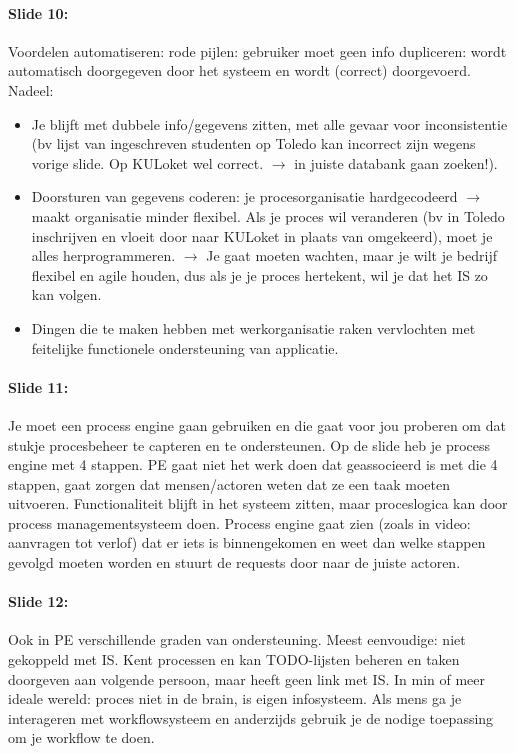 \documentclass[10pt,a4paper]{report}
\begin{document}
\paragraph{Slide 10:}Voordelen automatiseren: rode pijlen: gebruiker moet geen info dupliceren: wordt automatisch doorgegeven door het systeem en wordt (correct) doorgevoerd.\\
Nadeel:
\begin{itemize}
\item Je blijft met dubbele info/gegevens zitten, met alle gevaar voor inconsistentie (bv lijst van ingeschreven studenten op Toledo kan incorrect zijn wegens vorige slide. Op KULoket wel correct. $\rightarrow$ in juiste databank gaan zoeken!).
\item Doorsturen van gegevens coderen: je procesorganisatie hardgecodeerd $\rightarrow$ maakt organisatie minder flexibel. Als je proces wil veranderen (bv in Toledo inschrijven en vloeit door naar KULoket in plaats van omgekeerd), moet je alles herprogrammeren. $\rightarrow$ Je gaat moeten wachten, maar je wilt je bedrijf flexibel en agile houden, dus als je je proces hertekent, wil je dat het IS zo kan volgen.
\item Dingen die te maken hebben met werkorganisatie raken vervlochten met feitelijke functionele ondersteuning van applicatie.
\end{itemize}

\paragraph{Slide 11:}Je moet een process engine gaan gebruiken en die gaat voor jou proberen om dat stukje procesbeheer te capteren en te ondersteunen. Op de slide heb je process engine met 4 stappen. PE gaat niet het werk doen dat geassocieerd is met die 4 stappen, gaat zorgen dat mensen/actoren weten dat ze een taak moeten uitvoeren. Functionaliteit blijft in het systeem zitten, maar proceslogica kan door process managementsysteem doen. Process engine gaat zien (zoals in video: aanvragen tot verlof) dat er iets is binnengekomen en weet dan welke stappen gevolgd moeten worden en stuurt de requests door naar de juiste actoren.

\paragraph{Slide 12:}Ook in PE verschillende graden van ondersteuning. Meest eenvoudige: niet gekoppeld met IS. Kent processen en kan TODO-lijsten beheren en taken doorgeven aan volgende persoon, maar heeft geen link met IS. In min of meer ideale wereld: proces niet in de brain, is eigen infosysteem. Als mens ga je interageren met workflowsysteem en anderzijds gebruik je de nodige toepassing om je workflow te doen.
\end{document}
